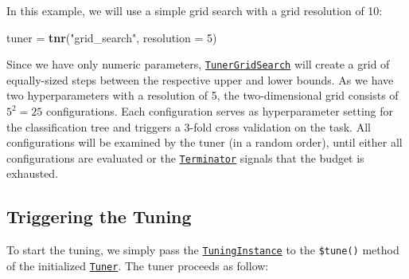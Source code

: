 \documentclass[]{scrbook}
\newenvironment{Shaded}{\begin{snugshade}}{\end{snugshade}}
\newcommand{\DataTypeTok}[1]{\textcolor[rgb]{0.13,0.29,0.53}{#1}}
\newcommand{\DecValTok}[1]{\textcolor[rgb]{0.00,0.00,0.81}{#1}}
\newcommand{\KeywordTok}[1]{\textcolor[rgb]{0.13,0.29,0.53}{\textbf{#1}}}
\newcommand{\NormalTok}[1]{#1}
\newcommand{\StringTok}[1]{\textcolor[rgb]{0.31,0.60,0.02}{#1}}
\renewenvironment{Shaded} {\begin{snugshade}\small} {\end{snugshade}}
\begin{document}
In this example, we will use a simple grid search with a grid resolution of 10:

\begin{Shaded}
\begin{Highlighting}[]
\NormalTok{tuner =}\StringTok{ }\KeywordTok{tnr}\NormalTok{(}\StringTok{"grid_search"}\NormalTok{, }\DataTypeTok{resolution =} \DecValTok{5}\NormalTok{)}
\end{Highlighting}
\end{Shaded}

Since we have only numeric parameters, \href{https://mlr3tuning.mlr-org.com/reference/mlr_tuners_grid_search.html}{\texttt{TunerGridSearch}} will create a grid of equally-sized steps between the respective upper and lower bounds.
As we have two hyperparameters with a resolution of 5, the two-dimensional grid consists of \(5^2 = 25\) configurations.
Each configuration serves as hyperparameter setting for the classification tree and triggers a 3-fold cross validation on the task.
All configurations will be examined by the tuner (in a random order), until either all configurations are evaluated or the \href{https://mlr3tuning.mlr-org.com/reference/Terminator.html}{\texttt{Terminator}} signals that the budget is exhausted.

\hypertarget{tuning-triggering}{%
\subsection{Triggering the Tuning}\label{tuning-triggering}}

To start the tuning, we simply pass the \href{https://mlr3tuning.mlr-org.com/reference/TuningInstance.html}{\texttt{TuningInstance}} to the \texttt{\$tune()} method of the initialized \href{https://mlr3tuning.mlr-org.com/reference/Tuner.html}{\texttt{Tuner}}.
The tuner proceeds as follow:
\end{document}
